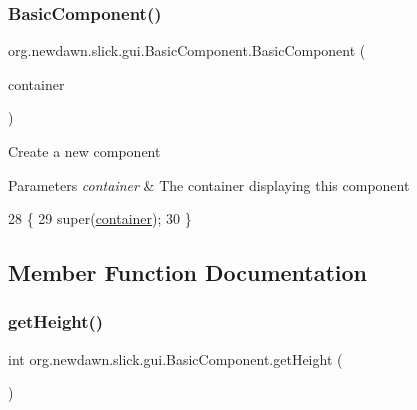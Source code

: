 \subsubsection{\texorpdfstring{Basic\+Component()}{BasicComponent()}}
{\footnotesize\ttfamily org.\+newdawn.\+slick.\+gui.\+Basic\+Component.\+Basic\+Component (\begin{DoxyParamCaption}\item[{\mbox{\hyperlink{interfaceorg_1_1newdawn_1_1slick_1_1gui_1_1_g_u_i_context}{G\+U\+I\+Context}}}]{container }\end{DoxyParamCaption})\hspace{0.3cm}{\ttfamily [inline]}}

Create a new component


\begin{DoxyParams}{Parameters}
{\em container} & The container displaying this component \\
\hline
\end{DoxyParams}

\begin{DoxyCode}
28                                                 \{
29         super(\mbox{\hyperlink{classorg_1_1newdawn_1_1slick_1_1gui_1_1_abstract_component_af6d1abaa24da0b9a06fb153722e15435}{container}});
30     \}
\end{DoxyCode}


\subsection{Member Function Documentation}
\mbox{\label{classorg_1_1newdawn_1_1slick_1_1gui_1_1_basic_component_a53da61b4cd4697cc51796e72014425cd}} 
\subsubsection{\texorpdfstring{get\+Height()}{getHeight()}}
{\footnotesize\ttfamily int org.\+newdawn.\+slick.\+gui.\+Basic\+Component.\+get\+Height (\begin{DoxyParamCaption}{ }\end{DoxyParamCaption})\hspace{0.3cm}{\ttfamily [inline]}}

